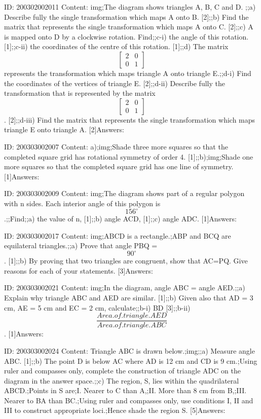 \documentclass{article}
\begin{document}
ID: 200302002011
Content:
img;The diagram shows triangles A, B, C and D. ;;a) Describe fully the single transformation which maps A onto B. [2];;b) Find the matrix that represents the single transformation which maps A onto C. [2];;c) A is mapped onto D by a clockwise rotation. Find;;c-i) the angle of this rotation. [1];;c-ii) the coordinates of the centre of this rotation. [1];;d) The matrix $$\begin{bmatrix}2&0\\0&1\end{bmatrix}$$ represents the transformation which maps triangle A onto triangle E.;;d-i) Find the coordinates of the vertices of triangle E. [2];;d-ii) Describe fully the transformation that is represented by the matrix $$\begin{bmatrix}2&0\\0&1\end{bmatrix}$$. [2];;d-iii) Find the matrix that represents the single transformation which maps triangle E onto triangle A. [2]Answers:

ID: 200303002007
Content:
a);img;Shade three more squares so that the completed square grid has rotational symmetry of order 4.   [1];;b);img;Shade one more squares so that the completed square grid has one line of symmetry.   [1]Answers:

ID: 200303002009
Content:
img;The diagram shows part of a regular polygon with n sides. Each interior angle of this polygon is $$156^{\circ}$$.;;Find;;a) the value of n,   [1];;b) angle ACD,   [1];;c) angle ADC.   [1]Answers:

ID: 200303002017
Content:
img;ABCD is a rectangle.;ABP and BCQ are equilateral triangles.;;a) Prove that angle PBQ = $$90^{\circ}$$.   [1];;b) By proving that two triangles are congruent, show that AC=PQ. Give reasons for each of your statements.   [3]Answers:

ID: 200303002021
Content:
img;In the diagram, angle ABC = angle AED.;;a) Explain why triangle ABC and AED are similar.   [1];;b) Given also that AD = 3 cm, AE = 5 cm and EC = 2 cm, calculate;;b-i) BD   [3];;b-ii) $$\frac{Area.of.triangle.AED}{Area.of.triangle.ABC}$$.   [1]Answers:

ID: 200303002024
Content:
Triangle ABC is drawn below.;img;;a) Measure angle ABC.   [1];;b) The point D is below AC where AD is 12 cm and CD is 9 cm.;Using ruler and compasses only, complete the construction of triangle ADC on the diagram in the answer space.;;c) The region, S, lies within the quadrilateral ABCD.;Points in S are;I.	Nearer to C than A,;II.	More than 8 cm from B,;III.	Nearer to BA than BC.;Using ruler and compasses only, use conditions I, II and III to construct appropriate loci.;Hence shade the region S.   [5]Answers:
\end{document}
